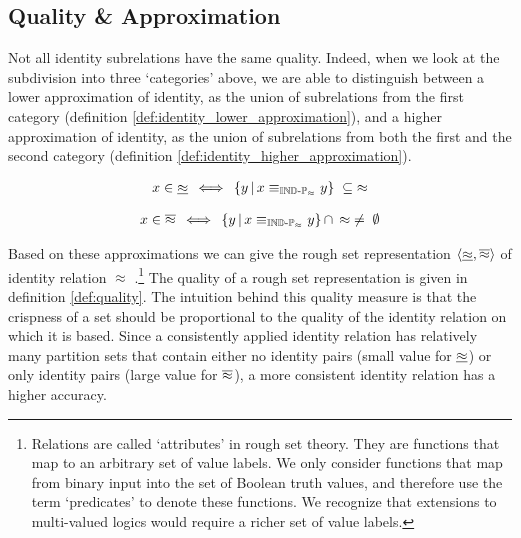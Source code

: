 \subsection{Quality \& Approximation}
\label{sec:approximation}

Not all identity subrelations have the same quality.
Indeed, when we look at the subdivision into three `categories' above,
  we are able to distinguish between a lower approximation of identity,
  as the union of subrelations from the first category
  (definition \ref{def:identity_lower_approximation}),
  and a higher approximation of identity,
  as the union of subrelations from both the first and the second category
  (definition \ref{def:identity_higher_approximation}).

\begin{definition}
\label{def:identity_lower_approximation}
\begin{align}
  x \in \underline{\approx}
\, \iff \,
    \{y\,\vert\,x \equiv_{\operatorname{{\mathbb{IND}-\mathbb{P}}}_{\approx}} y\}
  \; \subseteq \;
    \approx\nonumber
\end{align}
\end{definition}

\begin{definition}
\label{def:identity_higher_approximation}
\begin{align}
  x \in \overline{\approx}
\, \iff \,
      \{y\,\vert\,x \equiv_{\operatorname{{\mathbb{IND}-\mathbb{P}}}_{\approx}} y\}
    \, \cap \,
      \approx
  \; \neq \;
    \emptyset\nonumber
\end{align}
\end{definition}

\noindent Based on these approximations we can give
  the rough set representation $\langle\underline{\approx},\overline{\approx}\rangle$
  of identity relation $\approx$ \cite{Pawlak1991}.\footnote{
    Relations are called `attributes' in rough set theory.
    They are functions that map to an arbitrary set of value labels.
    We only consider functions that map from binary input into
      the set of Boolean truth values, and therefore use the term
     `predicates' to denote these functions.
    We recognize that extensions to multi-valued logics
      would require a richer set of value labels.
  }
The quality of a rough set representation is given in
  definition \ref{def:quality}.
The intuition behind this quality measure is that the crispness
  of a set should be proportional to the quality
  of the identity relation on which it is based.
Since a consistently applied identity relation has relatively many
  partition sets that contain either
  no identity pairs (small value for $\underline{\approx}$) or
  only identity pairs (large value for $\overline{\approx}$),
  a more consistent identity relation has a higher accuracy.

